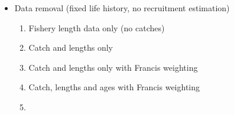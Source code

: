 \documentclass[11pt,
  english,
  a4paper,
]{article}
\begin{document}
\begin{itemize}
\item

  Data removal (fixed life history, no recruitment estimation)

  \tagmcend\tagstructend\tagstructend


  \begin{enumerate}
  \def\labelenumi{\arabic{enumi}.}
  \item


    Fishery length data only (no catches)

    \tagmcend\tagstructend\tagstructend

    \tagmcend\tagstructend\tagstructend
  \item


    Catch and lengths only

    \tagmcend\tagstructend\tagstructend

    \tagmcend\tagstructend\tagstructend
  \item


    Catch and lengths only with Francis weighting

    \tagmcend\tagstructend\tagstructend

    \tagmcend\tagstructend\tagstructend
  \item


    Catch, lengths and ages with Francis weighting

    \tagmcend\tagstructend\tagstructend

    \tagmcend\tagstructend\tagstructend
  \item


\end{enumerate}
\end{itemize}
\end{document}
